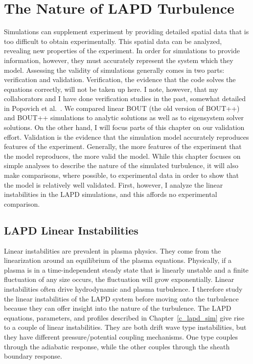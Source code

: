 \chapter{The Nature of LAPD Turbulence}
\label{c_lapd_turb}

Simulations can supplement experiment by providing detailed spatial data that is too difficult to obtain experimentally. This spatial data can be analyzed, revealing new properties
of the experiment. In order for simulations to provide information, however, they must accurately represent the system which they model. Assessing the validity of simulations generally
comes in two parts: verification and validation. Verification, the evidence that the code solves the equations correctly, will not be taken up here. I note, however, that my collaborators and I
have done verification studies in the past, somewhat detailed in Popovich et al.~\cite{Popovich2010a}. We compared linear BOUT (the old version of BOUT++) and BOUT++ simulations
to analytic solutions as well as to eigensystem solver solutions. On the other hand, I will focus parts of this chapter on our validation effort. Validation is the evidence that
the simulation model accurately reproduces features of the experiment. Generally, the more features of the experiment that the model reproduces, the more valid the model. While this chapter
focuses on simple analyses to describe the nature of the simulated turbulence, it will also make comparisons, where possible, to experimental data in order to show that the model is
relatively well validated. First, however, I analyze the linear instabilities in the LAPD simulations, and this affords no experimental comparison.

\section{LAPD Linear Instabilities}
\label{s_lin_inst}

Linear instabilities are prevalent in plasma physics. They come from the linearization around an equilibrium of the plasma equations. Physically, if a plasma is in a time-independent
steady state that is linearly unstable and a finite fluctuation of any size occurs, the fluctuation will grow exponentially. Linear instabilities often drive hydrodynamic and plasma
turbulence. I therefore study the linear instabilities of the LAPD system before moving onto the turbulence because they can offer insight into the nature of the turbulence.
The LAPD equations, parameters, and profiles described in Chapter~\ref{c_lapd_sim} give rise to a couple of linear instabilities. They are both drift wave type instabilities, but they 
have different pressure/potential coupling mechanisms. One type couples through the adiabatic response, while the other couples through the sheath boundary response.

